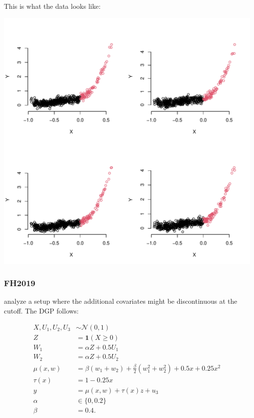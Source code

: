 \documentclass[11pt]{article}
\begin{document}
This is what the data looks like:

\begin{center}
\includegraphics[width=.9\linewidth]{ccft2019.pdf}
\end{center}

\subsubsection{FH2019}
\label{sec:org7d400ea}
\cite{frolich2019including} analyze a setup where the
additional covariates might be discontinuous at the
cutoff. The DGP follows:

\begin{equation}
  \begin{split}
    X,U_1,U_2,U_3 &\sim \mathcal{N}(0,1)\\
    Z &= \mathbf{1}(X \geq 0)\\
    W_1 &= \alpha Z + 0.5 U_1\\
    W_2 &= \alpha Z + 0.5 U_2\\
    \mu(x,w) &= \beta(w_1+w_2) + \frac{\beta}{2}(w_1^2+w_2^2) + 0.5 x + 0.25 x^2\\
    \tau(x) &= 1 - 0.25 x\\
    y &= \mu(x,w) + \tau(x) z + u_3\\
    \alpha &\in \{0,0.2\}\\
    \beta &= 0.4.
  \end{split}
\end{equation}
\end{document}
